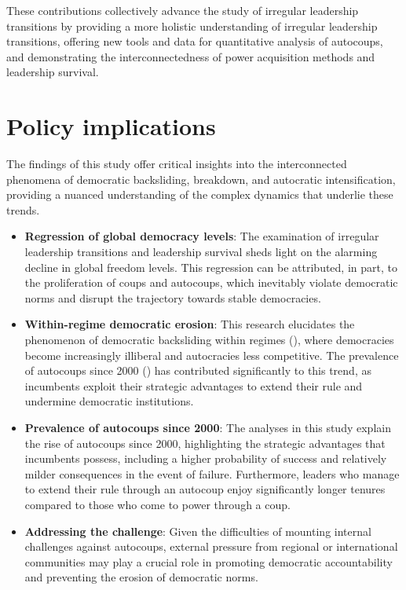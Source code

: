 \documentclass[
  12pt,
]{report}
\begin{document}
These contributions collectively advance the study of irregular
leadership transitions by providing a more holistic understanding of
irregular leadership transitions, offering new tools and data for
quantitative analysis of autocoups, and demonstrating the
interconnectedness of power acquisition methods and leadership survival.

\section{Policy implications}\label{policy-implications}

The findings of this study offer critical insights into the
interconnected phenomena of democratic backsliding, breakdown, and
autocratic intensification, providing a nuanced understanding of the
complex dynamics that underlie these trends.

\begin{itemize}
\item
  \textbf{Regression of global democracy levels}: The examination of
  irregular leadership transitions and leadership survival sheds light
  on the alarming decline in global freedom levels. This regression can
  be attributed, in part, to the proliferation of coups and autocoups,
  which inevitably violate democratic norms and disrupt the trajectory
  towards stable democracies.
\item
  \textbf{Within-regime democratic erosion}: This research elucidates
  the phenomenon of democratic backsliding within regimes
  (),
  where democracies become increasingly illiberal and autocracies less
  competitive. The prevalence of autocoups since 2000
  () has contributed significantly
  to this trend, as incumbents exploit their strategic advantages to
  extend their rule and undermine democratic institutions.
\item
  \textbf{Prevalence of autocoups since 2000}: The analyses in this
  study explain the rise of autocoups since 2000, highlighting the
  strategic advantages that incumbents possess, including a higher
  probability of success and relatively milder consequences in the event
  of failure. Furthermore, leaders who manage to extend their rule
  through an autocoup enjoy significantly longer tenures compared to
  those who come to power through a coup.
\item
  \textbf{Addressing the challenge}: Given the difficulties of mounting
  internal challenges against autocoups, external pressure from regional
  or international communities may play a crucial role in promoting
  democratic accountability and preventing the erosion of democratic
  norms.
\end{itemize}
\end{document}
